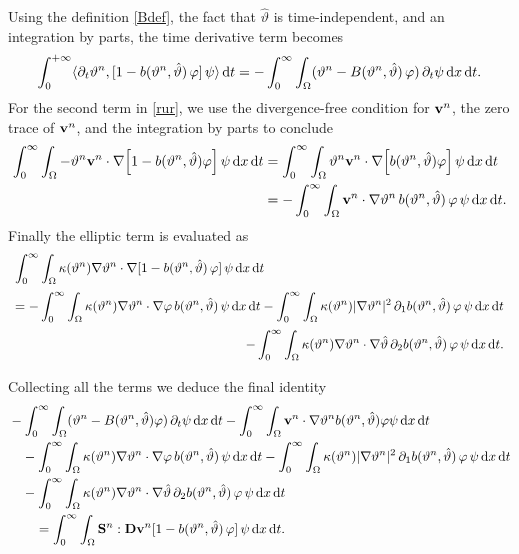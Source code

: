 \documentclass[11pt, a4paper, reqno]{amsart}
\newcommand{\dual}[2]{\langle #1,#2\rangle}
\numberwithin{equation}{section}
\newcommand{\thetah}{\hat\thet}
\newcommand{\vc}[1]{{\bf #1}}
\newcommand{\vv}{\vc{v}}
\newcommand{\thet}{\vartheta}
\renewcommand{\S}{\mathbf{S}}
\newcommand{\D}{\mathbf{D}}
\newcommand{\dt}{\,{\rm d} t }
\newcommand{\dx}{\,{\rm d} {x}}
\newcommand{\intnO}[1]{\int_0^{\infty}\intO{ #1 }\dt}
\newcommand{\intO}[1]{\int_{\Omega} #1 \dx}
\newcommand{\bb}{b}
\newcommand{\B}{B}
\begin{document}
Using the definition \eqref{Bdef}, the fact that $\thetah$ is time-independent, and an integration by parts, the time derivative term becomes
\begin{equation*}
\int_0^{+\infty}\dual{\partial_t\thet^{n}}{[1-\bb(\thet^n, \thetah)\,\varphi]\,\psi}\dt = - \intnO{(\thet^{n} - \B(\thet^n, \thetah)\,\varphi)\, \partial_t \psi}.
\end{equation*}
For the second term in \eqref{rur}, we use the divergence-free condition for $\vv^n$, the zero trace of $\vv^n$, and the integration by parts to conclude
\begin{equation*}
\begin{split}
   \intnO{-\thet^{n} \vv^{n} \cdot \nabla\!\left[1-\bb(\thet^n, \thetah)\varphi\right]  \psi}&=
   \intnO{\thet^{n} \vv^{n} \cdot \nabla\!\left[\bb(\thet^n, \thetah)\varphi\right]  \psi}\\
   &=-\intnO{\vv^{n} \cdot \nabla \thet^{n}  \, \bb(\thet^n, \thetah)\, \varphi\,  \psi}.
\end{split}
\end{equation*}
Finally the elliptic term is evaluated as 
\begin{equation*}
 \begin{array}{l}\displaystyle\vspace{6pt}
\intnO{\kappa(\thet^n)\nabla\thet^{n}\cdot \nabla [1-\bb(\thet^n, \thetah)\,\varphi]\,\psi}\\ \displaystyle\vspace{6pt}
\hfill = - \intnO{\kappa(\thet^n)\nabla\thet^{n}\cdot \nabla \varphi \,\bb(\thet^n, \thetah)\,\psi} - \intnO{\kappa(\thet^n)|\nabla\thet^{n}|^2 \,\partial_1\bb(\thet^n, \thetah)\, \varphi\, \psi}\\ \displaystyle\vspace{6pt}
\hfill-\intnO{\kappa(\thet^n)\nabla\thet^{n}\cdot\nabla\thetah \,\partial_{2} \bb(\thet^n, \thetah)\,\varphi \,\psi}.
\end{array}
\end{equation*}
Collecting all the terms we deduce  the final identity
\begin{equation}\label{temp} 
\begin{aligned}
&- \intnO{(\thet^{n} - \B(\thet^n, \thetah)\varphi) \,\partial_t \psi} -\intnO{\vv^{n}\cdot\nabla \thet^{n}\bb(\thet^n, \thetah)\varphi \psi}\\
&\quad - \intnO{\kappa(\thet^n)\nabla\thet^{n}\cdot \nabla \varphi \,\bb(\thet^n, \thetah)\,\psi} - \intnO{\kappa(\thet^n)|\nabla\thet^{n}|^2 \,\partial_1\bb(\thet^n, \thetah)\, \varphi \,\psi}\\
&\quad -\intnO{\kappa(\thet^n)\nabla\thet^{n}\cdot\nabla\thetah \,\partial_{2} \bb(\thet^n, \thetah)\,\varphi \,\psi}\\
&\qquad  = \intnO{\S^{n}: \D\vv^{n} [1-\bb(\thet^n, \thetah)\,\varphi]\,\psi}.
\end{aligned}
\end{equation}
\end{document}
